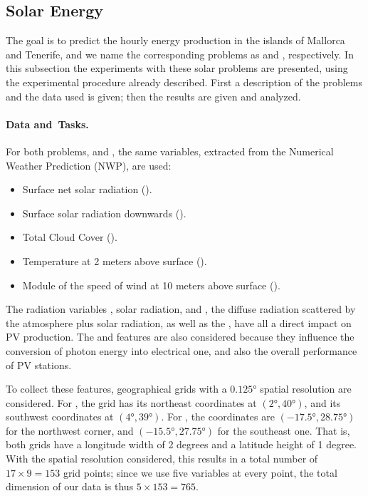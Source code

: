 \subsection{Solar Energy}
The goal is to predict the hourly energy production in the islands of Mallorca and Tenerife, and we name the corresponding problems as  and , respectively. 
%
In this subsection the experiments with these solar problems are presented, using the experimental procedure already described. First a description of the problems and the data used is given; then the results are given and analyzed.

\paragraph*{Data and~Tasks.\\}
For both problems,  and , the same variables, extracted from the Numerical Weather Prediction (NWP), are used:
\begin{itemize}
    \item Surface net solar {radiation} ().
    \item Surface solar radiation {downwards} ().
    \item {Total Cloud Cover} %
     ().
    \item Temperature at 2 {meters} above surface ().
    \item Module of the speed of wind at {10 meters} above surface ().
\end{itemize}
The radiation variables , solar radiation, and , the diffuse radiation scattered by the atmosphere plus solar radiation, as well as the , have all a direct impact on PV production.
%
The  and  features are also considered because they influence the conversion of photon energy into electrical one, and also the overall performance of PV stations.
%

To collect these features, geographical grids with a $\ang{0.125}$ spatial resolution are considered. For , the grid has its northeast coordinates at $(\ang{2}, \ang{40})$, and its southwest coordinates at $(\ang{4}, \ang{39})$. For , the coordinates are $(\ang{-17.5}, \ang{28.75})$ for the northwest corner, and $(\ang{-15.5}, \ang{27.75})$ for the southeast one.
%
That is, both grids have a longitude width of 2 degrees and a latitude height of 1 degree. With the spatial resolution considered, this results in a total number of $17 \times 9 = 153$ grid points; since we use five variables at every point, the total dimension of our data is thus $5 \times 153 = 765$. 


